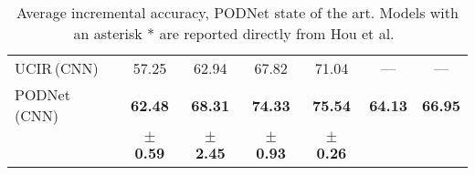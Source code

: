 \begin{table*}[t]
\begin{adjustbox}{max width=\textwidth}
\begin{tabular}{@{}l|cccc|cc@{}}
            UCIR\,{\scriptsize (CNN)}                     & 57.25                             & 62.94                            & 67.82                            & 71.04                            & ---            & ---            \\
            PODNet\,{\scriptsize (CNN)}                   & \textbf{62.48}                    & \textbf{68.31}                   & \textbf{74.33}                   & \textbf{75.54}                   & \textbf{64.13} & \textbf{66.95} \\

                                                          & \scriptsize{\textbf{$\pm$ 0.59}}  & \scriptsize{\textbf{$\pm$ 2.45}} & \scriptsize{\textbf{$\pm$ 0.93}} & \scriptsize{\textbf{$\pm$ 0.26}} &                &                \\

            \bottomrule
        \end{tabular}
    \end{adjustbox}
    \caption{Average incremental accuracy, PODNet \ivs state of the art. Models with an asterisk * are reported directly from Hou et al.~\cite{hou2019ucir}}
    \label{tab:podnet_quantitative_imagenet}
\end{table*}
